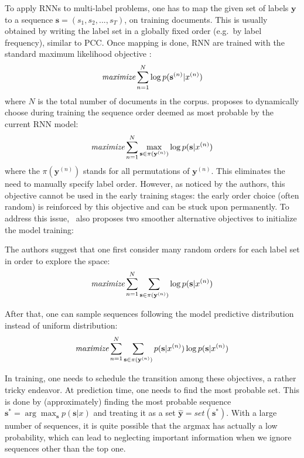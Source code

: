  
 To apply RNNs to multi-label problems, one has to map the given set of labels $\mathbf{y}$ to a sequence $\mathbf{s}=(s_1,s_2,...,s_T)$, on training documents. This is usually obtained by writing the label set in a globally fixed order (e.g.\ by label frequency), similar to PCC.
 Once mapping is done, RNN are trained with the standard maximum likelihood objective \cite{DBLP:conf/nips/NamMKF17}: 
\begin{align}
\textit{maximize} \sum_{n=1}^N \log p(\mathbf{s}^{(n)}|x^{(n)})
\label{eq:standard_rnn}
\end{align}
where $N$ is the total number of documents in the corpus.  proposes to dynamically choose during training the sequence order deemed as most probable by the current RNN model:
\begin{align}
\textit{maximize} \sum_{n=1}^N \max_{\mathbf{s}\in \pi(\mathbf{y}^{(n)})}\log p(\mathbf{s}|x^{(n)})
\label{eq:max_obj}
\end{align}
where the $\pi(\mathbf{y}^{(n)})$ stands for all  permutations of $\mathbf{y}^{(n)}$. This eliminates the need to manually specify label order.
However, as noticed by the authors, this objective cannot be used in the early training stages: the early order choice (often random) is reinforced by this objective and can be stuck upon permanently. To address this issue, ~also proposes two smoother alternative objectives to initialize the model training:

The authors suggest that one first consider many random orders for each label set in order to explore the space:
\begin{align}
\textit{maximize} \sum_{n=1}^N \sum_{\mathbf{s}\in \pi(\mathbf{y}^{(n)})}\log p(\mathbf{s}|x^{(n)})
\label{eq:wrong_obj}
\end{align} 

After that, one can sample sequences following the model predictive distribution instead of uniform distribution:
\begin{align}
\textit{maximize} \sum_{n=1}^N \sum_{\mathbf{s}\in \pi(\mathbf{y}^{(n)})}p(\mathbf{s}|x^{(n)})\log p(\mathbf{s}|x^{(n)})
\label{eq:sample_obj}
\end{align}  

In training, one needs to  schedule the transition among these objectives, a rather tricky endeavor. At prediction time, one needs to find the most probable set. This is done by (approximately) finding the most probable sequence $\mathbf{s}^*=\arg\max_\mathbf{s} p(\mathbf{s}|x)$ and treating it as a set $\hat{\mathbf{y}}=set(\mathbf{s}^*)$. With a large number of sequences, it is quite possible that the argmax has actually a low probability, which can lead to neglecting important information when we ignore sequences other than the top one.

